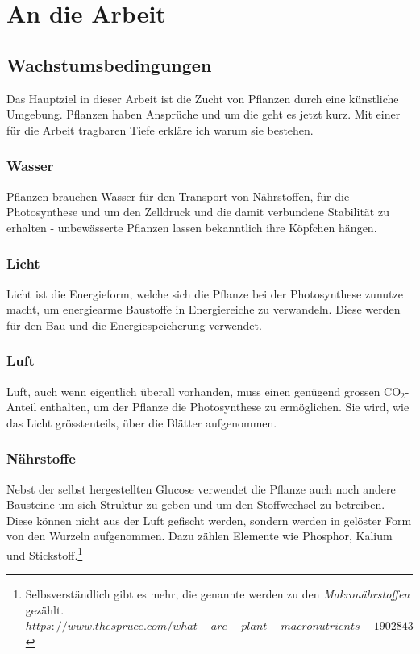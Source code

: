 \documentclass[12pt,titlepage,a4paper]{article}
\begin{document}
\section{An die Arbeit}
\subsection{Wachstumsbedingungen}
Das Hauptziel in dieser Arbeit ist die Zucht von Pflanzen durch eine künstliche Umgebung. Pflanzen haben Ansprüche und um die geht es jetzt kurz. Mit einer für die Arbeit tragbaren Tiefe erkläre ich warum sie bestehen.

\subsubsection{Wasser}
Pflanzen brauchen Wasser für den Transport von Nährstoffen, für die Photosynthese und um den Zelldruck und die damit verbundene Stabilität zu erhalten - unbewässerte Pflanzen lassen bekanntlich ihre Köpfchen hängen.


\subsubsection{Licht}
Licht ist die Energieform, welche sich die Pflanze bei der Photosynthese zunutze macht, um energiearme Baustoffe in Energiereiche zu verwandeln. Diese werden für den Bau und die Energiespeicherung verwendet. 

\subsubsection{Luft}
Luft, auch wenn eigentlich überall vorhanden, muss einen genügend grossen CO$_{2}$-Anteil enthalten, um der Pflanze die Photosynthese zu ermöglichen. Sie wird, wie das Licht grösstenteils, über die Blätter aufgenommen.

\subsubsection{Nährstoffe}
Nebst der selbst hergestellten Glucose verwendet die Pflanze auch noch andere Bausteine um sich Struktur zu geben und um den Stoffwechsel zu betreiben. Diese können nicht aus der Luft gefischt werden, sondern werden in gelöster Form von den Wurzeln aufgenommen. Dazu zählen Elemente wie Phosphor, Kalium und Stickstoff.\footnote{Selbsverständlich gibt es mehr, die genannte werden zu den \textit{Makronährstoffen} gezählt. $https://www.thespruce.com/what-are-plant-macronutrients-1902843$}
\end{document}
